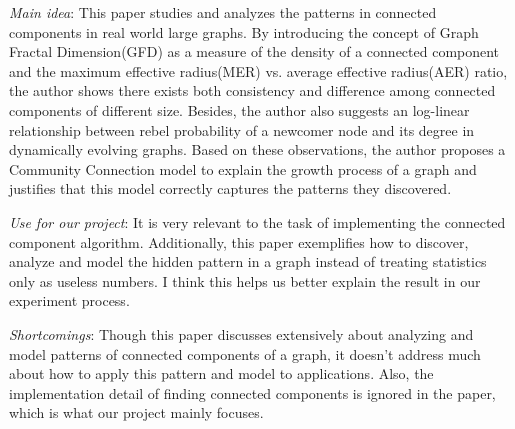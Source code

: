 \begin{itemize*}
\item {\em Main idea}: 
		This paper studies and analyzes the patterns in connected components in real world large graphs. By introducing the concept of Graph Fractal Dimension(GFD) as a measure of the density of a connected component and the maximum effective radius(MER) vs. average effective radius(AER) ratio, the author shows there exists both consistency and difference among connected components of different size. Besides, the author also suggests an log-linear relationship between rebel probability of a newcomer node and its degree in dynamically evolving graphs. Based on these observations, the author proposes a Community Connection model to explain the growth process of a graph and justifies that this model correctly captures the patterns they discovered.

\item {\em Use for our project}:
      It is very relevant to the task of implementing the connected component algorithm. Additionally, this paper exemplifies how to discover, analyze and model the hidden pattern in a graph instead of treating statistics only as useless numbers. I think this helps us better explain the result in our experiment process.

\item {\em Shortcomings}:
	Though this paper discusses extensively about analyzing and model patterns of connected components of a graph, it doesn’t address much about how to apply this pattern and model to applications. Also, the implementation detail of finding connected components is ignored in the paper, which is what our project mainly focuses.

\end{itemize*}

